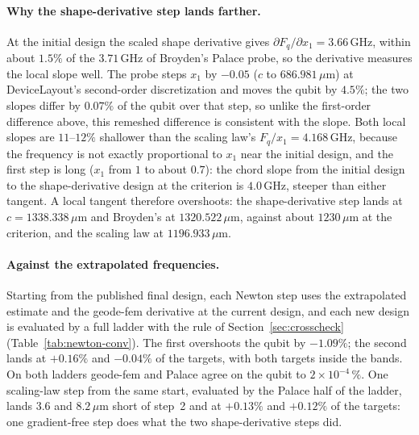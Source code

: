 \documentclass{anvil-paper}
\begin{document}
\paragraph{Why the shape-derivative step lands farther.}
At the initial design the scaled shape derivative gives
$\partial F_q/\partial x_1 = 3.66$\,GHz, within about $1.5\%$ of the $3.71$\,GHz
of Broyden's Palace probe, so the derivative measures the local slope
well. The probe steps $x_1$ by $-0.05$ ($c$ to $686.981\,\mu$m) at
DeviceLayout's second-order discretization and moves the qubit by $4.5\%$;
the two slopes differ by $0.07\%$ of the qubit over that step, so unlike
the first-order difference above, this remeshed difference is consistent
with the slope. Both local slopes are $11$--$12\%$ shallower than the scaling law's
$F_q/x_1 = 4.168$\,GHz, because the frequency is not exactly proportional
to $x_1$ near the initial design, and the first step is long ($x_1$ from
$1$ to about $0.7$): the chord slope from the initial design to the
shape-derivative design at the criterion is $4.0$\,GHz, steeper than either
tangent. A local tangent therefore overshoots: the
shape-derivative step lands at $c = 1338.338\,\mu$m and Broyden's at
$1320.522\,\mu$m, against about $1230\,\mu$m at the criterion, and the
scaling law at $1196.933\,\mu$m.

\paragraph{Against the extrapolated frequencies.}
Starting from the published final design, each Newton step uses the
extrapolated estimate and the geode-fem derivative at the current design,
and each new design is evaluated by a full ladder with the rule of
Section~\ref{sec:crosscheck} (Table~\ref{tab:newton-conv}).
The first overshoots the qubit by $-1.09\%$; the second lands at $+0.16\%$
and $-0.04\%$ of the targets, with both targets inside the bands. On both
ladders geode-fem and Palace agree on the qubit to $2\times10^{-4}\,\%$.
One scaling-law step from the same start, evaluated by the Palace half of
the ladder, lands $3.6$ and $8.2\,\mu$m short of step~2 and at $+0.13\%$
and $+0.12\%$ of the targets: one gradient-free step does what the two
shape-derivative steps did.
\end{document}
